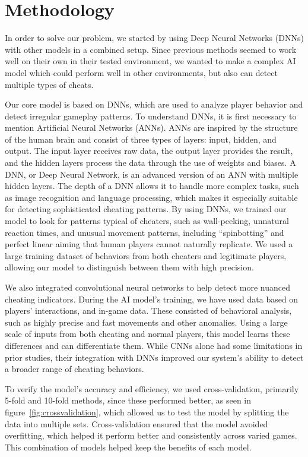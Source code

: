 \section{Methodology}
\label{ch:methodology}

In order to solve our problem, we started by using Deep Neural Networks (DNNs) with other models in a combined setup. Since previous methods seemed to work well on their own in their tested environment, we wanted to make a complex AI model which could perform well in other environments, but also can detect multiple types of cheats.

Our core model is based on DNNs, which are used to analyze player behavior and detect irregular gameplay patterns. To understand DNNs, it is first necessary to mention Artificial Neural Networks (ANNs). ANNs are inspired by the structure of the human brain and consist of three types of layers: input, hidden, and output. The input layer receives raw data, the output layer provides the result, and the hidden layers process the data through the use of weights and biases. A DNN, or Deep Neural Network, is an advanced version of an ANN with multiple hidden layers. The depth of a DNN allows it to handle more complex tasks, such as image recognition and language processing, which makes it especially suitable for detecting sophisticated cheating patterns. By using DNNs, we trained our model to look for patterns typical of cheaters, such as wall-peeking, unnatural reaction times, and unusual movement patterns, including “spinbotting” and perfect linear aiming that human players cannot naturally replicate. We used a large training dataset of behaviors from both cheaters and legitimate players, allowing our model to distinguish between them with high precision.

We also integrated convolutional neural networks to help detect more nuanced cheating indicators. During the AI model's training, we have used data based on players' interactions, and in-game data. These consisted of behavioral analysis, such as highly precise and fast movements and other anomalies. Using a large scale of inputs from both cheating and normal players, this model learns these differences and can differentiate them. While CNNs alone had some limitations in prior studies, their integration with DNNs improved our system’s ability to detect a broader range of cheating behaviors.

To verify the model’s accuracy and efficiency, we used cross-validation, primarily 5-fold and 10-fold methods, since these performed better, as seen in figure~\ref{fig:crossvalidation}, which allowed us to test the model by splitting the data into multiple sets. Cross-validation ensured that the model avoided overfitting, which helped it perform better and consistently across varied games. This combination of models helped keep the benefits of each model.

